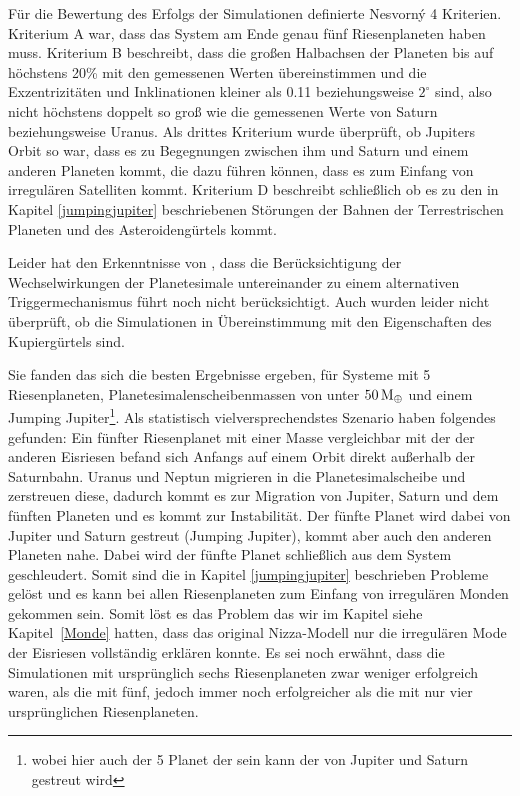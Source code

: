 \documentclass[12pt,a4paper,twoside]{article}
\renewcommand{\cite}{\citep}
\newcommand{\refsec}[1]{siehe Kapitel~\ref{#1}}
\newcommand{\ME}{M_\oplus}
\begin{document}
Für die Bewertung des Erfolgs der Simulationen definierte Nesvorný 4 Kriterien. Kriterium A war, dass das System am Ende genau fünf Riesenplaneten haben muss. Kriterium B beschreibt, dass die großen Halbachsen der Planeten bis auf höchstens 20\% mit den gemessenen Werten übereinstimmen und die Exzentrizitäten und Inklinationen kleiner als 0.11 beziehungsweise $2^\circ$ sind, also nicht höchstens doppelt so groß wie die gemessenen Werte von Saturn beziehungsweise Uranus.
Als drittes Kriterium wurde überprüft, ob Jupiters Orbit so war, dass es zu Begegnungen zwischen ihm und Saturn und einem anderen Planeten kommt, die dazu führen können, dass es zum Einfang von irregulären Satelliten kommt.
Kriterium D beschreibt schließlich ob es zu den in Kapitel \ref{jumpingjupiter} beschriebenen Störungen der Bahnen der Terrestrischen Planeten und des Asteroidengürtels kommt. %

Leider hat \cite{Nesvorny2012} den Erkenntnisse von \cite{Levison2011}, dass die Berücksichtigung der Wechselwirkungen der Planetesimale untereinander zu einem alternativen Triggermechanismus führt noch nicht berücksichtigt. Auch wurden leider nicht überprüft, ob die Simulationen in Übereinstimmung mit den Eigenschaften des Kupiergürtels sind.

Sie fanden das sich die besten Ergebnisse ergeben, für Systeme mit 5 Riesenplaneten, Planetesimalenscheibenmassen von unter $\unit[50]{\ME}$ und einem Jumping Jupiter\footnote{wobei hier auch der 5 Planet der sein kann der von Jupiter und Saturn gestreut wird}.
Als statistisch vielversprechendstes Szenario haben \cite{Nesvorny2012} folgendes gefunden:
Ein fünfter Riesenplanet mit einer Masse vergleichbar mit der der anderen Eisriesen befand sich Anfangs auf einem Orbit direkt außerhalb der Saturnbahn.
Uranus und Neptun migrieren in die Planetesimalscheibe und zerstreuen diese, dadurch kommt es zur Migration von Jupiter, Saturn und dem fünften Planeten und es kommt zur Instabilität. Der fünfte Planet wird dabei von Jupiter und Saturn gestreut (Jumping Jupiter), kommt aber auch den anderen Planeten nahe. Dabei wird der fünfte Planet schließlich aus dem System geschleudert. %
Somit sind die in Kapitel \ref{jumpingjupiter} beschrieben Probleme gelöst und es kann bei allen Riesenplaneten zum Einfang von irregulären Monden gekommen sein. Somit löst es das Problem das wir im Kapitel \refsec{Monde} hatten, dass das original Nizza-Modell nur die irregulären Mode der Eisriesen vollständig erklären konnte.
Es sei noch erwähnt, dass die Simulationen mit ursprünglich sechs Riesenplaneten zwar weniger erfolgreich waren, als die mit fünf, jedoch immer noch erfolgreicher als die mit nur vier ursprünglichen Riesenplaneten.
\end{document}
